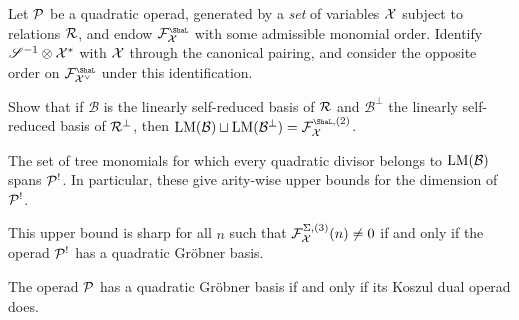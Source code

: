 \begin{question}
\end{question}
\begin{question}\label{ex:quadratic-GB-dual} 
Let ${\mathcal{P}}$ be a quadratic operad, generated by a \emph{set}
of variables $\mathcal{X}$ subject to relations $\mathcal{R}$, 
and endow $\FF_\XX^\Sha$ with some
admissible monomial order. Identify $\mathscr{S}^{-1}\otimes \mathcal{X}^*$
with $\mathcal{X}$ through the canonical pairing, and consider
the opposite order on $\FF_{\XX^\vee}^\Sha$ 
under this identification.
\begin{tenumerate}
\item Show that if $\mathcal B$ is the linearly self-reduced
basis of $\mathcal{R}$ and $\mathcal B^\perp$ the linearly self-reduced
basis of $\mathcal{R}^\perp$, then $\leadm{\mathcal B}\sqcup
\leadm{\mathcal B^\perp} = \FF_\XX^{\Sha,(2)}$.
\item The set of tree monomials for which every quadratic divisor belongs to $\operatorname{LM}(\mathcal B)$ spans ${\mathcal{P}}^!$. In particular, these give
arity-wise upper bounds for the dimension of ${\mathcal{P}}^!$.
\item This upper bound is sharp for all $n$ such that $\mathcal{F}_{\mathcal{X}}^{\Sigma,(3)}(n) \neq 0$ if and only if the operad ${\mathcal{P}}^!$ has a quadratic 
Gr\"obner basis.
\item The operad  ${\mathcal{P}}$ has a quadratic 
Gr\"obner basis if and only if its Koszul dual operad does. 
\end{tenumerate}
\end{question}